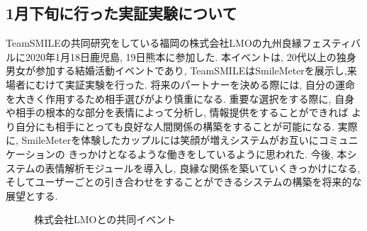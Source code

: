 \subsection{1月下旬に行った実証実験について}
TeamSMILEの共同研究をしている福岡の株式会社LMOの九州良縁フェスティバルに2020年1月18日鹿児島,
19日熊本に参加した. 本イベントは, 20代以上の独身男女が参加する結婚活動イベントであり,
TeamSMILEはSmileMeterを展示し,来場者にむけて実証実験を行った.
将来のパートナーを決める際には, 自分の運命を大きく作用するため相手選びがより慎重になる.
重要な選択をする際に, 自身や相手の根本的な部分を表情によって分析し, 情報提供をすることができれば
より自分にも相手にとっても良好な人間関係の構築をすることが可能になる.
実際に, SmileMeterを体験したカップルには笑顔が増えシステムがお互いにコミュニケーションの
きっかけとなるような働きをしているように思われた.
今後, 本システムの表情解析モジュールを導入し, 良縁な関係を築いていくきっかけになる,
そしてユーザーごとの引き合わせをすることができるシステムの構築を将来的な展望とする.

\begin{figure}[htbp]
    \begin{center}
    \end{center}
    \caption{株式会社LMOとの共同イベント}
    \label{fig:lmo}
\end{figure}

